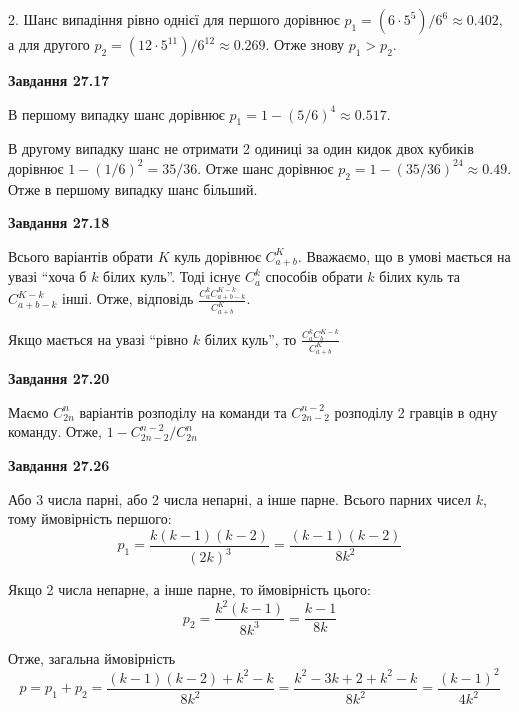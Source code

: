 \documentclass[12pt]{extarticle}
\begin{document}
2. Шанс випадіння рівно однієї для першого дорівнює $p_1=(6 \cdot 5^5)/6^6 \approx 0.402$, а для другого $p_2=(12 \cdot 5^{11})/6^{12} \approx 0.269$. Отже знову $p_1>p_2$.  

\textbf{Завдання 27.17}

В першому випадку шанс дорівнює $p_1=1-(5/6)^4 \approx 0.517$. 

В другому випадку шанс не отримати 2 одиниці за один кидок двох кубиків дорівнює $1 - (1/6)^2=35/36$. Отже шанс дорівнює $p_2=1-(35/36)^{24} \approx 0.49$. Отже в першому випадку шанс більший.

\textbf{Завдання 27.18}

Всього варіантів обрати $K$ куль дорівнює $C_{a+b}^K$. Вважаємо, що в умові мається на увазі ``хоча б $k$ білих куль''. Тоді існує $C_{a}^k$ способів обрати $k$ білих куль та $C_{a+b-k}^{K-k}$ інші. Отже, відповідь $\frac{C_a^kC_{a+b-k}^{K-k}}{C_{a+b}^K}$.

Якщо мається на увазі ``рівно $k$ білих куль'', то $\frac{C_a^kC_b^{K-k}}{C_{a+b}^K}$

\textbf{Завдання 27.20}

Маємо $C_{2n}^n$ варіантів розподілу на команди та $C_{2n-2}^{n-2}$ розподілу 2 гравців в одну команду. Отже, $1-C_{2n-2}^{n-2}/C_{2n}^n$ 

\textbf{Завдання 27.26}

Або 3 числа парні, або 2 числа непарні, а інше парне. Всього парних чисел $k$, тому ймовірність першого:
\[
p_1 = \frac{k(k-1)(k-2)}{(2k)^3} = \frac{(k-1)(k-2)}{8k^2}
\]

Якщо 2 числа непарне, а інше парне, то ймовірність цього:
\[
p_2 = \frac{k^2(k-1)}{8k^3} = \frac{k-1}{8k} 
\]

Отже, загальна ймовірність
\[
p = p_1 + p_2 = \frac{(k-1)(k-2) + k^2 - k}{8k^2} = \frac{k^2-3k+2+k^2-k}{8k^2} = \frac{(k-1)^2}{4k^2}
\]
\end{document}
